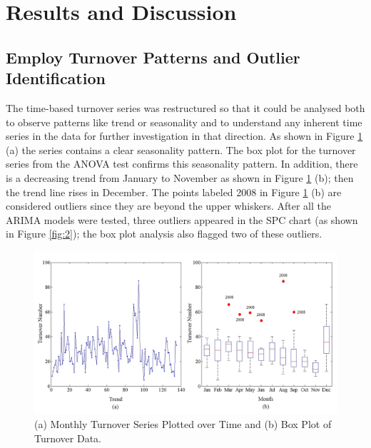 \section{Results and Discussion}
\subsection{Employ Turnover Patterns and Outlier Identification}
The time-based turnover series was restructured so that it could be analysed both to observe patterns like trend or seasonality and to understand any inherent time series in the data for further investigation in that direction. 
As shown in Figure \ref{fig:1} (a) the series contains a clear seasonality pattern. The box plot for the turnover series from the ANOVA test confirms this seasonality pattern. In addition, there is a decreasing trend from January to November as shown in Figure \ref{fig:1} (b); then the trend line rises in December. The points labeled  2008 in Figure \ref{fig:1} (b) are considered outliers since they are beyond the upper whiskers. After all the ARIMA models were tested, three outliers appeared in the SPC chart (as shown in Figure \ref{fig:2}); the box plot analysis also flagged two of these outliers. 
\begin{figure}
	\centering
	\includegraphics[width=5in]{Fig1.jpg}
	\caption{(a) Monthly Turnover Series Plotted over Time and (b) Box Plot of Turnover Data.}
	\label{fig:1}
\end{figure}
